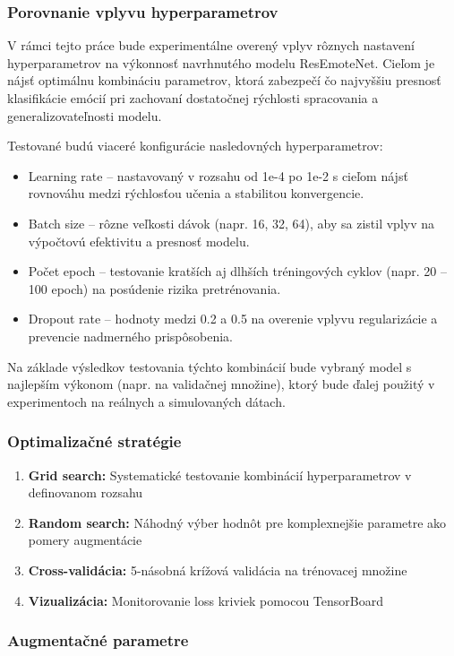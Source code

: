 \subsubsection{Porovnanie vplyvu hyperparametrov}
V rámci tejto práce bude experimentálne overený vplyv rôznych nastavení hyperparametrov na výkonnosť navrhnutého modelu ResEmoteNet. Cieľom je nájsť optimálnu kombináciu parametrov, ktorá zabezpečí čo najvyššiu presnosť klasifikácie emócií pri zachovaní dostatočnej rýchlosti spracovania a generalizovateľnosti modelu.

Testované budú viaceré konfigurácie nasledovných hyperparametrov:
\begin{itemize}
    \item Learning rate – nastavovaný v rozsahu od 1e-4 po 1e-2 s cieľom nájsť rovnováhu medzi rýchlosťou učenia a stabilitou konvergencie.
    \item Batch size – rôzne veľkosti dávok (napr. 16, 32, 64), aby sa zistil vplyv na výpočtovú efektivitu a presnosť modelu.
    \item Počet epoch – testovanie kratších aj dlhších tréningových cyklov (napr. 20 – 100 epoch) na posúdenie rizika pretrénovania.
    \item Dropout rate – hodnoty medzi 0.2 a 0.5 na overenie vplyvu regularizácie a prevencie nadmerného prispôsobenia.
\end{itemize}

Na základe výsledkov testovania týchto kombinácií bude vybraný model s najlepším výkonom (napr. na validačnej množine), ktorý bude ďalej použitý v experimentoch na reálnych a simulovaných dátach.
\subsubsection{Optimalizačné stratégie}

\begin{enumerate}
    \item \textbf{Grid search:} Systematické testovanie kombinácií hyperparametrov v definovanom rozsahu
    \item \textbf{Random search:} Náhodný výber hodnôt pre komplexnejšie parametre ako pomery augmentácie
    \item \textbf{Cross-validácia:} 5-násobná krížová validácia na trénovacej množine
    \item \textbf{Vizualizácia:} Monitorovanie loss kriviek pomocou TensorBoard
\end{enumerate}

\subsubsection{Augmentačné parametre}

